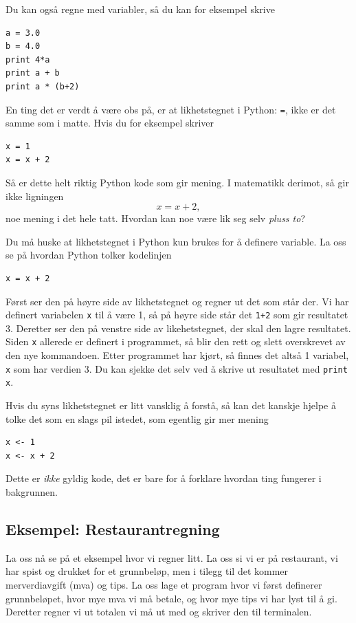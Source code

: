 \documentclass[a4paper, 11pt, notitlepage]{article}
\begin{document}
Du kan også regne med variabler, så du kan for eksempel skrive
\begin{lstlisting}
a = 3.0
b = 4.0
print 4*a
print a + b 
print a * (b+2)
\end{lstlisting}

En ting det er verdt å være obs på, er at likhetstegnet i Python: \verb+=+, ikke er det samme som i matte. Hvis du for eksempel skriver
\begin{lstlisting}
x = 1
x = x + 2
\end{lstlisting}
Så er dette helt riktig Python kode som gir mening. I matematikk derimot, så gir ikke ligningen
$$x = x + 2,$$
noe mening i det hele tatt. Hvordan kan noe være lik seg selv \emph{pluss to}?

Du må huske at likhetstegnet i Python kun brukes for å definere variable. La oss se på hvordan Python tolker kodelinjen
\begin{lstlisting}
x = x + 2
\end{lstlisting}
Først ser den på høyre side av likhetstegnet og regner ut det som står der. Vi har definert variabelen \verb+x+ til å være 1, så på høyre side står det \verb!1+2! som gir resultatet 3. Deretter ser den på venstre side av likehetstegnet, der skal den lagre resultatet. Siden \verb+x+ allerede er definert i programmet, så blir den rett og slett overskrevet av den nye kommandoen. Etter programmet har kjørt, så finnes det altså 1 variabel, \verb+x+ som har verdien 3. Du kan sjekke det selv ved å skrive ut resultatet med \verb+print x+.

Hvis du syns likhetstegnet er litt vansklig å forstå, så kan det kanskje hjelpe å tolke det som en slags pil istedet, som egentlig gir mer mening
\begin{lstlisting}
x <- 1
x <- x + 2
\end{lstlisting}
Dette er \emph{ikke} gyldig kode, det er bare for å forklare hvordan ting fungerer i bakgrunnen.

\subsection*{Eksempel: Restaurantregning}
La oss nå se på et eksempel hvor vi regner litt. La oss si vi er på restaurant, vi har spist og drukket for et grunnbeløp, men i tilegg til det kommer merverdiavgift (mva) og tips. La oss lage et program hvor vi først definerer grunnbeløpet, hvor mye mva vi må betale, og hvor mye tips vi har lyst til å gi. Deretter regner vi ut totalen vi må ut med og skriver den til terminalen. 
\end{document}
